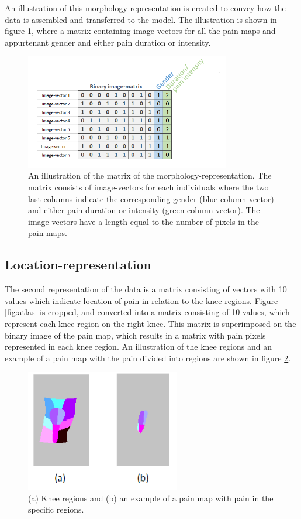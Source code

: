 \noindent
An illustration of this morphology-representation is created to convey how the data is assembled and transferred to the model. The illustration is shown in figure \ref{fig:binmatrix}, where a matrix containing image-vectors for all the pain maps and appurtenant gender and either pain duration or intensity.

\begin{figure} [H]
\centering
\includegraphics[width=0.8\textwidth]{figures/binaryimagematrix}
\caption{An illustration of the matrix of the morphology-representation. The matrix consists of image-vectors for each individuals where the two last columns indicate the corresponding gender (blue column vector) and either pain duration or intensity (green column vector). The image-vectors have a length equal to the number of pixels in the pain maps.}
\label{fig:binmatrix}
\end{figure}


\subsection{Location-representation} \label{sec:Regions}
The second representation of the data is a matrix consisting of vectors with 10 values which indicate location of pain in relation to the knee regions.
Figure \ref{fig:atlas} is cropped, and converted into a matrix consisting of 10 values, which represent each knee region on the right knee. This matrix is superimposed on the binary image of the pain map, which results in a matrix with pain pixels represented in each knee region. 
An illustration of the knee regions and an example of a pain map with the pain divided into regions are shown in figure \ref{fig:binregions}.

\begin{figure} [H]
\centering
\includegraphics[width=0.6\textwidth]{figures/binregions}
\caption{(a) Knee regions and (b) an example of a pain map with pain in the specific regions.}
\label{fig:binregions}
\end{figure}

